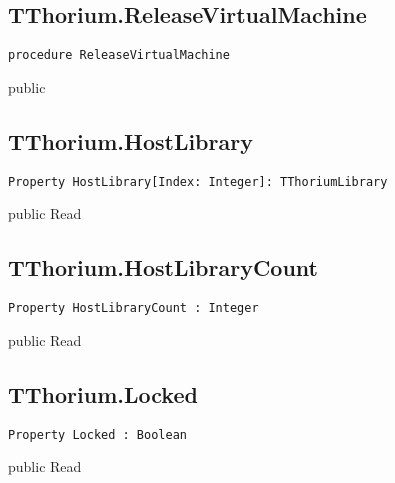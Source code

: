 \subsection{TThorium.ReleaseVirtualMachine}
\label{thoriumcore:thorium:tthorium:releasevirtualmachine}
\begin{FPCList}
\Synopsis
\Declaration 

\begin{verbatim}
procedure ReleaseVirtualMachine
\end{verbatim}
\Visibility
public
\Description
\Errors
\end{FPCList}
\subsection{TThorium.HostLibrary}
\label{thoriumcore:thorium:tthorium:hostlibrary}
\begin{FPCList}
\Synopsis
\Declaration 

\begin{verbatim}
Property HostLibrary[Index: Integer]: TThoriumLibrary
\end{verbatim}
\Visibility
public
\Access
Read
\Description
\end{FPCList}
\subsection{TThorium.HostLibraryCount}
\label{thoriumcore:thorium:tthorium:hostlibrarycount}
\begin{FPCList}
\Synopsis
\Declaration 

\begin{verbatim}
Property HostLibraryCount : Integer
\end{verbatim}
\Visibility
public
\Access
Read
\Description
\end{FPCList}
\subsection{TThorium.Locked}
\label{thoriumcore:thorium:tthorium:locked}
\begin{FPCList}
\Synopsis
\Declaration 

\begin{verbatim}
Property Locked : Boolean
\end{verbatim}
\Visibility
public
\Access
Read
\Description
\end{FPCList}
